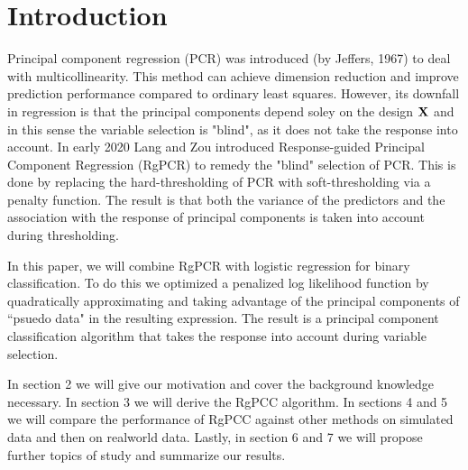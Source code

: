 \documentclass[main.tex]{subfiles}
\begin{document}
\section{Introduction}
Principal component regression (PCR) was introduced (by Jeffers, 1967) to deal with multicollinearity. This method can achieve dimension reduction and improve prediction performance compared to ordinary least squares. However, its downfall in regression is that the principal components depend soley on the design $\mathbf{X}$ and in this sense the variable selection is "blind", as it does not take the response into account. In early 2020 Lang and Zou \cite{langzou} introduced Response-guided Principal Component Regression (RgPCR) to remedy the "blind" selection of PCR. This is done by replacing the hard-thresholding of PCR with soft-thresholding via a penalty function. The result is that both the variance of the predictors and the association with the response of principal components is taken into account during thresholding.

In this paper, we will combine RgPCR with logistic regression for binary classification. To do this we optimized a penalized log likelihood function by quadratically approximating and taking advantage of the principal components of ``psuedo data" in the resulting expression. The result is a principal component classification algorithm that takes the response into account during variable selection.

In section 2 we will give our motivation and cover the background knowledge necessary. In section 3 we will derive the RgPCC algorithm. In sections 4 and 5 we will compare the performance of RgPCC against other methods on simulated data and then on realworld data. Lastly, in section 6 and 7 we will propose further topics of study and summarize our results.
\end{document}
